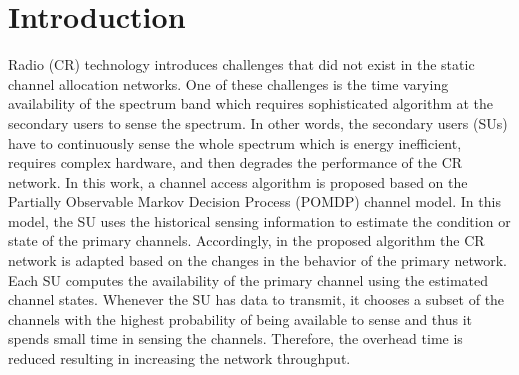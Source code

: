 \documentclass[twocolumn]{el-author}
\begin{document}
\section{Introduction}
	Radio (CR) technology introduces challenges that did not exist in the static channel allocation networks. One of these challenges is the time varying availability of the spectrum band which requires sophisticated algorithm at the secondary users to sense the spectrum\cite{AhmedGaniAbolfazliEtAl2016,Lunden2015}. In other words, the secondary users (SUs) have to continuously sense the whole spectrum which is energy inefficient, requires complex hardware, and then degrades the performance of the CR network.
	In this work, a channel access algorithm is proposed based on the Partially Observable Markov Decision Process (POMDP) channel model. In this model, the SU uses the historical sensing information to estimate the condition or state of the primary channels. Accordingly, in the proposed algorithm the CR network is adapted based on the changes in the behavior of the primary network. Each SU computes the availability of the primary channel using the estimated channel states. Whenever the SU has data to transmit, it chooses a subset of the channels with the highest probability of being available to sense and thus it spends small time in sensing the channels. Therefore, the overhead time is reduced resulting in increasing the network throughput.
%	
\end{document}
